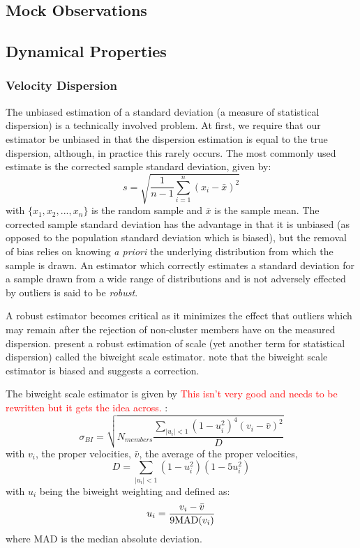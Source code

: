 \documentclass[apj, revtex4]{emulateapj}
\newcommand{\editorial}[1]{\textcolor{red}{#1} }
\begin{document}
\subsection{Mock Observations}

\subsection{Dynamical Properties}
\subsubsection{Velocity Dispersion}
The unbiased estimation of a standard deviation (a measure of statistical dispersion) is a technically involved problem. At first, we require that our estimator be unbiased in that the dispersion estimation is equal to the true dispersion, although, in practice this rarely occurs. The most commonly used estimate is the corrected sample standard deviation, given by:
\begin{equation}
	s = \sqrt{\frac{1}{n-1} \sum_{i=1}^n (x_i - \bar{x})^2}
\end{equation}
with $\{x_1, x_2, ..., x_n\}$ is the random sample and $\bar{x}$ is the sample mean. The corrected sample standard deviation has the advantage in that it is unbiased (as opposed to the population standard deviation which is biased), but the removal of bias relies on knowing \textit{a priori} the underlying distribution from which the sample is drawn. An estimator which correctly estimates a standard deviation for a sample drawn from a wide range of distributions and is not adversely effected by outliers is said to be \textit{robust}.

A robust estimator becomes critical as it minimizes the effect that outliers which may remain after the rejection of non-cluster members have on the measured dispersion. \cite{Beers1990} present a robust estimation of scale (yet another term for statistical dispersion) called the biweight scale estimator. \cite{Ruel2014} note that the biweight scale estimator is biased and suggests a correction. 

The biweight scale estimator is given by \editorial{This isn't very good and needs to be rewritten but it gets the idea across.}:
\begin{equation}
	\sigma_{BI} = \sqrt{ N_{members} \frac{ \sum_{|u_i|<1} (1-u_i^2)^4 (v_i - \bar{v})^2} {D} }
\end{equation}
with $v_i$, the proper velocities, $\bar{v}$, the average of the proper velocities,
\begin{equation}
	D = \sum_{|u_i|<1} (1-u_i^2)(1-5u_i^2)
\end{equation}
with $u_i$ being the biweight weighting and defined as:
\begin{equation}
	u_i = \frac{v_i - \bar{v}}{9 {\rm MAD}(v_i)}
\end{equation}
where MAD is the median absolute deviation.
\end{document}
